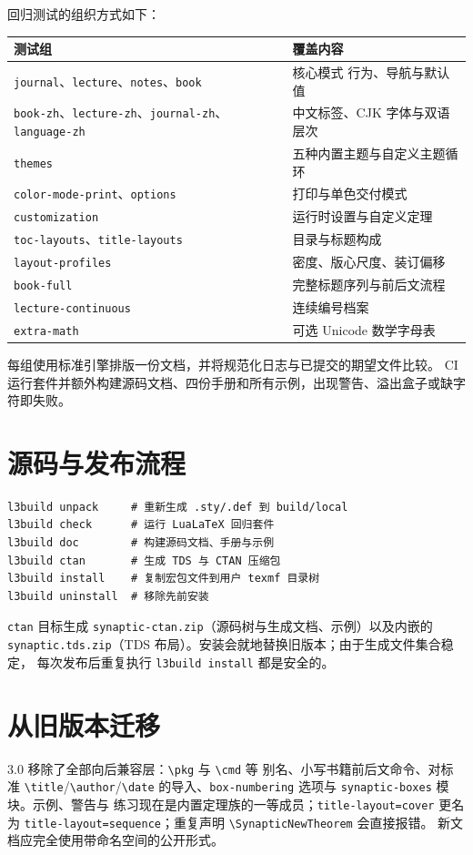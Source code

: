 \documentclass[a4paper,11pt]{scrartcl}
\begin{document}
回归测试的组织方式如下：

{\setlength{\parindent}{0pt}\noindent\begin{tabularx}{\textwidth}{@{}l Y@{}}
  \toprule
  \textbf{测试组} & \textbf{覆盖内容} \\
  \midrule
  \texttt{journal}、\texttt{lecture}、\texttt{notes}、\texttt{book} & 核心模式
  行为、导航与默认值 \\
  \texttt{book-zh}、\texttt{lecture-zh}、\texttt{journal-zh}、
  \texttt{language-zh} & 中文标签、CJK 字体与双语层次 \\
  \texttt{themes} & 五种内置主题与自定义主题循环 \\
  \texttt{color-mode-print}、\texttt{options} & 打印与单色交付模式 \\
  \texttt{customization} & 运行时设置与自定义定理 \\
  \texttt{toc-layouts}、\texttt{title-layouts} & 目录与标题构成 \\
  \texttt{layout-profiles} & 密度、版心尺度、装订偏移 \\
  \texttt{book-full} & 完整标题序列与前后文流程 \\
  \texttt{lecture-continuous} & 连续编号档案 \\
  \texttt{extra-math} & 可选 Unicode 数学字母表 \\
  \bottomrule
\end{tabularx}}

每组使用标准引擎排版一份文档，并将规范化日志与已提交的期望文件比较。
CI 运行套件并额外构建源码文档、四份手册和所有示例，出现警告、溢出盒子或缺字符即失败。

\section{源码与发布流程}

\begin{verbatim}
l3build unpack     # 重新生成 .sty/.def 到 build/local
l3build check      # 运行 LuaLaTeX 回归套件
l3build doc        # 构建源码文档、手册与示例
l3build ctan       # 生成 TDS 与 CTAN 压缩包
l3build install    # 复制宏包文件到用户 texmf 目录树
l3build uninstall  # 移除先前安装
\end{verbatim}

\texttt{ctan} 目标生成 \texttt{synaptic-ctan.zip}（源码树与生成文档、示例）以及内嵌的
\texttt{synaptic.tds.zip}（TDS 布局）。安装会就地替换旧版本；由于生成文件集合稳定，
每次发布后重复执行 \texttt{l3build install} 都是安全的。

\section{从旧版本迁移}

3.0 移除了全部向后兼容层：\texttt{\backslash pkg} 与 \texttt{\backslash cmd} 等
别名、小写书籍前后文命令、对标准 \texttt{\backslash title}/\texttt{\backslash author}/\texttt{\backslash date}
的导入、\texttt{box-numbering} 选项与 \texttt{synaptic-boxes} 模块。示例、警告与
练习现在是内置定理族的一等成员；\texttt{title-layout=cover} 更名为
\texttt{title-layout=sequence}；重复声明 \verb|\SynapticNewTheorem| 会直接报错。
新文档应完全使用带命名空间的公开形式。
\end{document}
